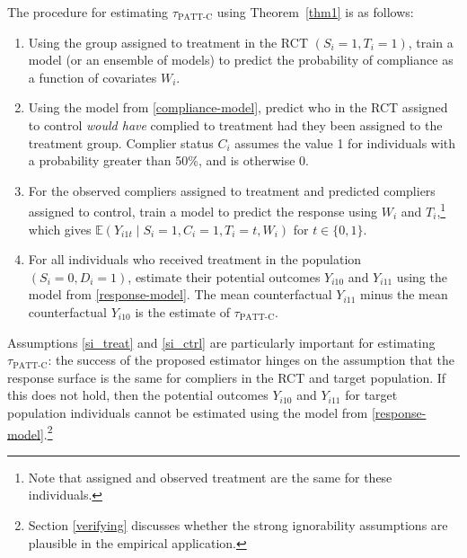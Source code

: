 \documentclass[hidelinks,12pt]{article}
\newcommand{\ex}{\mathbb{E}} %
\begin{document}
{The procedure for estimating $\tau_{\text{PATT-C}}$ using Theorem~\ref{thm1} is as follows:
\begin{enumerate}[label=\textbf{S.\arabic*},ref=S.\arabic*]
\item Using the group assigned to treatment in the RCT $(S_i=1, T_i=1)$, train a model {\color{red}(or an ensemble of models)} to predict {\color{red}the probability of compliance as a function of covariates $W_i$.} \label{compliance-model}
\item Using the model from \ref{compliance-model}, predict who in the RCT assigned to control \textit{would have} complied to treatment had they been assigned to the treatment group. {\color{red} Complier status $C_i$ assumes the value 1 for individuals with a probability greater than 50\%, and is otherwise 0.} \label{complier-predict}
\item {\color{red}For the observed compliers assigned to treatment and predicted compliers assigned to control, train a model to predict the response using $W_i$ and $T_i$,\footnote{Note that assigned and observed treatment are the same for these individuals.} which gives} $\ex(Y_{i1t} \mid S_i=1, C_i=1, T_i=t, W_i)$ for $t \in \{0,1\}$.\label{response-model}
\item For all individuals who received treatment in the population $(S_i=0, D_i=1)$, estimate their potential outcomes $Y_{i10}$ and $Y_{i11}$ using the model from \ref{response-model}. The mean counterfactual $Y_{i11}$ minus the mean counterfactual $Y_{i10}$ is the estimate of $\tau_{\text{PATT-C}}$.\label{response-predict}
\end{enumerate}

Assumptions \ref{si_treat} and \ref{si_ctrl} are particularly important for estimating $\tau_{\text{PATT-C}}$: the success of the proposed estimator hinges on the assumption that the response surface is the same for compliers in the RCT and target population. If this does not hold, then the potential outcomes $Y_{i10}$ and $Y_{i11}$ for target population individuals cannot be estimated using the model from \ref{response-model}.\footnote{{\color{red}Section \ref{verifying} discusses whether the strong ignorability assumptions are plausible in the empirical application.}}

{\color{red}
}}
\end{document}
